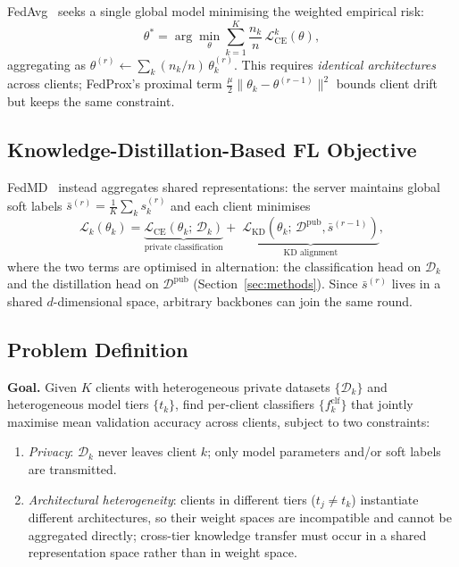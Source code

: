 \documentclass[conference]{IEEEtran}
\begin{document}
FedAvg~\cite{mcmahan2017fedavg} seeks a single global model minimising
the weighted empirical risk:
\begin{equation}
  \theta^* = \arg\min_{\theta}
  \sum_{k=1}^{K} \frac{n_k}{n}\,
  \mathcal{L}_{\text{CE}}^k(\theta),
  \label{eq:fedavg}
\end{equation}
aggregating as $\theta^{(r)} \gets \sum_k (n_k/n)\,\theta_k^{(r)}$.
This requires \emph{identical architectures} across clients; FedProx's
proximal term $\frac{\mu}{2}\|\theta_k - \theta^{(r-1)}\|^2$ bounds
client drift but keeps the same constraint.

\subsection{Knowledge-Distillation-Based FL Objective}

FedMD~\cite{li2019fedmd} instead aggregates shared representations: the
server maintains global soft labels
$\bar{s}^{(r)} = \frac{1}{K}\sum_k s_k^{(r)}$ and each client minimises
\begin{equation}
  \mathcal{L}_k(\theta_k) =
  \underbrace{\mathcal{L}_{\text{CE}}(\theta_k;\,\mathcal{D}_k)}_{\text{private classification}}
  +\;
  \underbrace{\mathcal{L}_{\text{KD}}(\theta_k;\,\mathcal{D}^{\text{pub}},\bar{s}^{(r-1)})}_{\text{KD alignment}},
  \label{eq:fedkd}
\end{equation}
where the two terms are optimised in alternation: the classification
head on $\mathcal{D}_k$ and the distillation head on
$\mathcal{D}^{\text{pub}}$ (Section~\ref{sec:methods}).
Since $\bar{s}^{(r)}$ lives in a shared $d$-dimensional space, arbitrary
backbones can join the same round.

\subsection{Problem Definition}

\textbf{Goal.} Given $K$ clients with heterogeneous private datasets
$\{\mathcal{D}_k\}$ and heterogeneous model tiers $\{t_k\}$, find
per-client classifiers $\{f_k^{\text{clf}}\}$ that jointly maximise
mean validation accuracy across clients, subject to two constraints:
\begin{enumerate}
  \item \emph{Privacy}: $\mathcal{D}_k$ never leaves client $k$;
    only model parameters and/or soft labels are transmitted.
  \item \emph{Architectural heterogeneity}: clients in different tiers
    ($t_j \neq t_k$) instantiate different architectures, so their
    weight spaces are incompatible and cannot be aggregated directly;
    cross-tier knowledge transfer must occur in a shared representation
    space rather than in weight space.
\end{enumerate}
\end{document}
